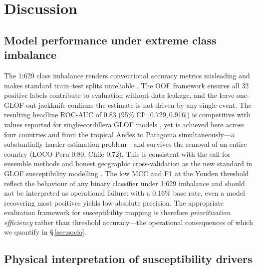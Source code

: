 \documentclass[pdflatex,sn-basic]{sn-jnl}%
\begin{document}
\section{Discussion}\label{sec:discussion}

\subsection{Model performance under extreme class imbalance}

The 1:629 class imbalance renders conventional accuracy metrics
misleading and makes standard train--test splits unreliable
\citep{Lobo2008,Chicco2020}. The OOF framework ensures all 32 positive
labels contribute to evaluation without data leakage, and the
leave-one-GLOF-out jackknife confirms the estimate is not driven by any
single event. The resulting headline ROC-AUC of 0.83 (95\% CI:
[0.729,\,0.916]) is competitive with values reported for single-cordillera
GLOF models \citep{Emmer2020,Rounce2017}, yet is achieved here across four
countries and from the tropical Andes to Patagonia simultaneously---a
substantially harder estimation problem---and survives the removal of an
entire country (LOCO Peru 0.80, Chile 0.72). This is consistent with the
call for ensemble methods and honest geographic cross-validation as the
new standard in GLOF susceptibility modelling \citep{Pronk2022}.
The low MCC and F1 at the Youden threshold reflect the
behaviour of any binary classifier under 1:629 imbalance and should not
be interpreted as operational failure: with a 0.16\% base rate, even a
model recovering most positives yields low absolute precision. The
appropriate evaluation framework for susceptibility mapping is therefore
\textit{prioritization efficiency} \citep{Merghadi2020,Pourghasemi2020}
rather than threshold accuracy---the operational consequences of which
we quantify in \S\,\ref{sec:socio}.

\subsection{Physical interpretation of susceptibility drivers}
\end{document}
